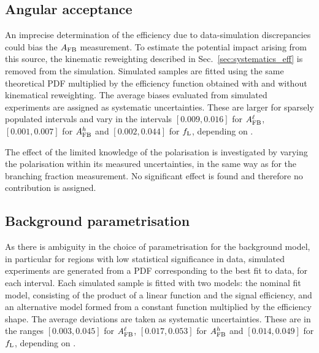 \subsection{Angular acceptance}
 An imprecise determination of the efficiency due to data-simulation
 discrepancies could bias the $A_{\rm FB}$ measurement.  To estimate
 the potential impact arising from this source, the kinematic
 reweighting described in Sec.~\ref{sec:systematics_eff} is removed
 from the simulation.  Simulated samples are fitted using the same
 theoretical PDF multiplied by the efficiency function obtained with
 and without kinematical reweighting.  The average biases evaluated
 from simulated experiments are assigned as systematic uncertainties.
 These are larger for sparsely populated \qsq intervals and vary in
 the intervals $[0.009,0.016]$ for $A_{\rm FB}^\ell$, $[0.001,0.007]$
 for $A_{\rm FB}^h$ and $[0.002,0.044]$ for $f_{\rm L}$, depending on
 \qsq.

 The effect of the limited knowledge of the \Lb polarisation is
 investigated by varying the polarisation within its measured
 uncertainties, in the same way as for the branching fraction
 measurement. No significant effect is found and therefore no
 contribution is assigned.

\subsection{Background parametrisation}
\label{sec:bkgShapeSys}
As there is ambiguity in the choice of parametrisation for the
background model, in particular for regions with low statistical
significance in data, simulated experiments are generated from a PDF
corresponding to the best fit to data, for each \qsq interval. Each
simulated sample is fitted with two models: the nominal fit model,
consisting of the product of a linear function and the signal
efficiency, and an alternative model formed from a constant function
multiplied by the efficiency shape.  The average deviations are taken
as systematic uncertainties.  These are in the ranges $[0.003,0.045]$
for $A_{\rm FB}^\ell$, $[0.017,0.053]$ for $A_{\rm FB}^h$ and
$[0.014,0.049]$ for $f_{\rm L}$, depending on \qsq.

